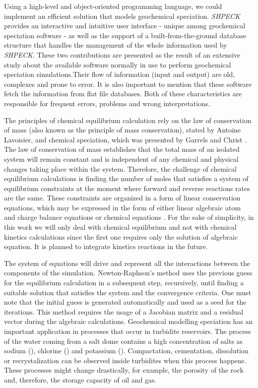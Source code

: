 Using a high-level and object-oriented programming language, we could implement an efficient solution that models geochemical speciation. \emph{SHPECK} provides an interactive and intuitive user interface - unique among geochemical speciation software - as well as the support of a built-from-the-ground database structure that handles the management of the whole information used by \emph{SHPECK}. These two contributions are presented as the result of an extensive study about the available software normally in use to perform geochemical speciation simulations.Their flow of information (input and output) are old, complexes and prone to error. It is also important to mention that these software fetch the information from flat file databases. Both of these characteristics are responsible for frequent errors, problems and wrong interpretations.


The principles of chemical equilibrium calculation rely on the law of conservation of mass (also known as the principle of mass conservation), stated by Antoine Lavoisier, and chemical speciation, which was presented by Garrels and Christ  \cite{Garrels:65}. The law of conservation of mass establishes that the total mass of an isolated system will remain constant and is independent of any chemical and physical changes taking place within the system. Therefore, the challenge of chemical equilibrium calculations is finding the number of moles that satisfies a system of equilibrium constraints at the moment where forward and reverse reactions rates are the same. These constraints are organized in a form of linear conservation equations, which may be expressed in the form of either linear algebraic atom and charge balance equations or chemical equations \cite{SmithMissen83}. For the sake of simplicity, in this work we will only deal with chemical equilibrium and not with chemical kinetics calculations since the first one requires only the solution of algebraic equation. It is planned to integrate kinetics reactions in the future.


The system of equations will drive and represent all the interactions between the components of the simulation. Newton-Raphson's method uses the previous guess for the equilibrium calculation in a subsequent step, recursively, until finding a suitable solution that satisfies the system and the convergence criteria. One must note that the initial guess is generated automatically and used as a seed for the iterations. This method requires the usage of a Jacobian matrix and a residual vector during the algebraic calculations. Geochemical modelling speciation has an important application in processes that occur in turbidite reservoirs. The process of the water coming from a salt dome contains a high concentration of salts as sodium (), chlorine () and potassium (). Compactation, cementation, dissolution or recrystalization can be observed inside turbidites when this process happens. These processes might change drastically, for example, the porosity of the rock and, therefore, the storage capacity of oil and gas.

